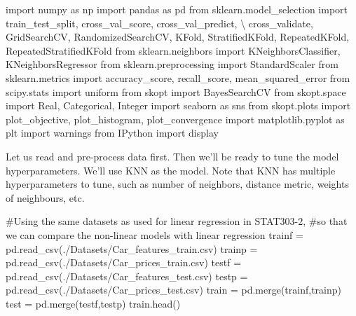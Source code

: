 \documentclass[
  letterpaper,
  DIV=11,
  numbers=noendperiod]{scrreprt}
\newenvironment{Shaded}{\begin{snugshade}}{\end{snugshade}}
\newcommand{\CommentTok}[1]{\textcolor[rgb]{0.37,0.37,0.37}{#1}}
\newcommand{\ImportTok}[1]{\textcolor[rgb]{0.00,0.46,0.62}{#1}}
\newcommand{\NormalTok}[1]{\textcolor[rgb]{0.00,0.23,0.31}{#1}}
\newcommand{\OperatorTok}[1]{\textcolor[rgb]{0.37,0.37,0.37}{#1}}
\newcommand{\StringTok}[1]{\textcolor[rgb]{0.13,0.47,0.30}{#1}}
\begin{document}
\begin{Shaded}
\begin{Highlighting}[]
\ImportTok{import}\NormalTok{ numpy }\ImportTok{as}\NormalTok{ np}
\ImportTok{import}\NormalTok{ pandas }\ImportTok{as}\NormalTok{ pd}
\ImportTok{from}\NormalTok{ sklearn.model\_selection }\ImportTok{import}\NormalTok{ train\_test\_split, cross\_val\_score, cross\_val\_predict, }\OperatorTok{\textbackslash{}}
\NormalTok{cross\_validate, GridSearchCV, RandomizedSearchCV, KFold, StratifiedKFold, RepeatedKFold, RepeatedStratifiedKFold}
\ImportTok{from}\NormalTok{ sklearn.neighbors }\ImportTok{import}\NormalTok{ KNeighborsClassifier, KNeighborsRegressor}
\ImportTok{from}\NormalTok{ sklearn.preprocessing }\ImportTok{import}\NormalTok{ StandardScaler}
\ImportTok{from}\NormalTok{ sklearn.metrics }\ImportTok{import}\NormalTok{ accuracy\_score, recall\_score, mean\_squared\_error}
\ImportTok{from}\NormalTok{ scipy.stats }\ImportTok{import}\NormalTok{ uniform}
\ImportTok{from}\NormalTok{ skopt }\ImportTok{import}\NormalTok{ BayesSearchCV}
\ImportTok{from}\NormalTok{ skopt.space }\ImportTok{import}\NormalTok{ Real, Categorical, Integer}
\ImportTok{import}\NormalTok{ seaborn }\ImportTok{as}\NormalTok{ sns}
\ImportTok{from}\NormalTok{ skopt.plots }\ImportTok{import}\NormalTok{ plot\_objective, plot\_histogram, plot\_convergence}
\ImportTok{import}\NormalTok{ matplotlib.pyplot }\ImportTok{as}\NormalTok{ plt}
\ImportTok{import}\NormalTok{ warnings}
\ImportTok{from}\NormalTok{ IPython }\ImportTok{import}\NormalTok{ display}
\end{Highlighting}
\end{Shaded}

Let us read and pre-process data first. Then we'll be ready to tune the
model hyperparameters. We'll use KNN as the model. Note that KNN has
multiple hyperparameters to tune, such as number of neighbors, distance
metric, weights of neighbours, etc.

\begin{Shaded}
\begin{Highlighting}[]
\CommentTok{\#Using the same datasets as used for linear regression in STAT303{-}2, }
\CommentTok{\#so that we can compare the non{-}linear models with linear regression}
\NormalTok{trainf }\OperatorTok{=}\NormalTok{ pd.read\_csv(}\StringTok{\textquotesingle{}./Datasets/Car\_features\_train.csv\textquotesingle{}}\NormalTok{)}
\NormalTok{trainp }\OperatorTok{=}\NormalTok{ pd.read\_csv(}\StringTok{\textquotesingle{}./Datasets/Car\_prices\_train.csv\textquotesingle{}}\NormalTok{)}
\NormalTok{testf }\OperatorTok{=}\NormalTok{ pd.read\_csv(}\StringTok{\textquotesingle{}./Datasets/Car\_features\_test.csv\textquotesingle{}}\NormalTok{)}
\NormalTok{testp }\OperatorTok{=}\NormalTok{ pd.read\_csv(}\StringTok{\textquotesingle{}./Datasets/Car\_prices\_test.csv\textquotesingle{}}\NormalTok{)}
\NormalTok{train }\OperatorTok{=}\NormalTok{ pd.merge(trainf,trainp)}
\NormalTok{test }\OperatorTok{=}\NormalTok{ pd.merge(testf,testp)}
\NormalTok{train.head()}
\end{Highlighting}
\end{Shaded}
\end{document}
